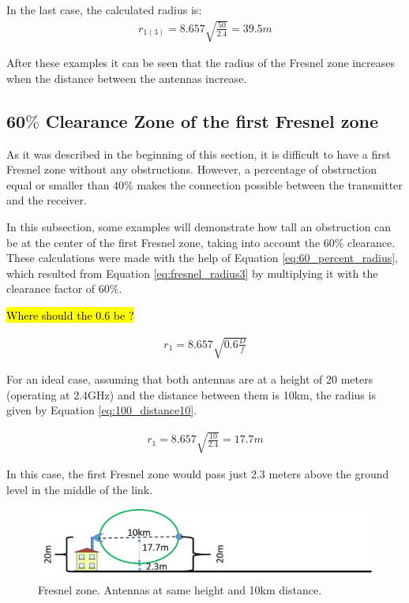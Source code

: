 In the last case, the calculated radius is:
\begin{align*}
r_{1(3)} = 8.657\sqrt{\frac{50}{2.4}} = 39.5m
\end{align*}

After these examples it can be seen that the radius of the Fresnel zone increases when the distance between the antennas increase.

\subsection{60$\%$ Clearance Zone of the first Fresnel zone}
As it was described in the beginning of this section, it is difficult to have a first Fresnel zone without any obstructions. However, a percentage of obstruction equal or smaller than 40$\%$ makes the connection possible between the transmitter and the receiver.

In this subsection, some examples will demonstrate how tall an obstruction can be at the center of the first Fresnel zone, taking into account the 60$\%$ clearance. These calculations were made with the help of Equation \ref{eq:60_percent_radius}, which resulted from Equation \ref{eq:fresnel_radius3} by multiplying it with the clearance factor of 60$\%$.

\hl{Where should the 0.6 be ?}

\begin{align}
r_1 = 8.657\sqrt{0.6\frac{D}{f}}\label{eq:60_percent_radius}
\end{align}

For an ideal case, assuming that both antennas are at a height of 20 meters (operating at 2.4GHz) and the distance between them is 10km, the radius is given by Equation \ref{eq:100_distance10}.

\begin{align}
r_1 = 8.657\sqrt{\frac{10}{2.4}} = 17.7m\label{eq:100_distance10}
\end{align}

In this case, the first Fresnel zone would pass just 2.3 meters above the ground level in the middle of the link. 

\begin{figure}[H]
	\centering
	\includegraphics[scale=0.50]{figures/fresnel_10km_height.png}
	\caption{Fresnel zone. Antennas at same height and 10km distance.}
	\label{fig:fresnel_zones_10km_height}
\end{figure}  

